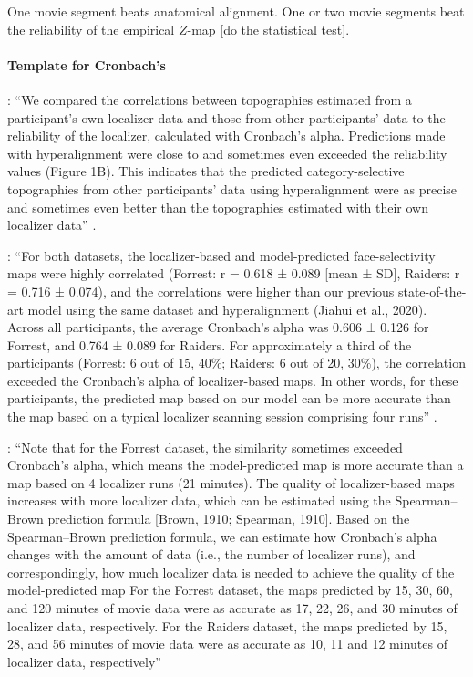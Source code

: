 One movie segment beats anatomical alignment.
%
One or two movie segments beat the reliability of the empirical $Z$-map [do the
statistical test].


\paragraph{Template for Cronbach's}

%
\citep{jiahui2022cross}: ``We compared the correlations between topographies
estimated from a participant's own localizer data and those from other
participants' data to the reliability of the localizer, calculated with
Cronbach's alpha.
%
Predictions made with hyperalignment were close to and sometimes even exceeded
the reliability values (Figure 1B).
%
This indicates that the predicted category-selective topographies from other
participants' data using hyperalignment were as precise and sometimes even
better than the topographies estimated with their own localizer data''
\citep{jiahui2022cross}.

%
\citep{feilong2022individualized}: ``For both datasets, the localizer-based and
model-predicted face-selectivity maps were highly correlated (Forrest: r = 0.618
± 0.089 [mean ± SD], Raiders: r = 0.716 ± 0.074), and the correlations were
higher than our previous state-of-the-art model using the same dataset and
hyperalignment (Jiahui et al., 2020).
%
Across all participants, the average Cronbach's alpha was 0.606 ± 0.126 for
Forrest, and 0.764 ± 0.089 for Raiders.
%
For approximately a third of the participants (Forrest: 6 out of 15, 40\%;
Raiders: 6 out of 20, 30\%), the correlation exceeded the Cronbach's alpha of
localizer-based maps.
%
In other words, for these participants, the predicted map based on our model can
be more accurate than the map based on a typical localizer scanning session
comprising four runs'' \citep{feilong2022individualized}.

%
\citep{feilong2022individualized}: ``Note that for the Forrest dataset, the
similarity sometimes exceeded Cronbach's alpha, which means the model-predicted
map is more accurate than a map based on 4 localizer runs (21 minutes).
%
The quality of localizer-based maps increases with more localizer data, which
can be estimated using the Spearman–Brown prediction formula [Brown, 1910;
Spearman, 1910].
%
Based on the Spearman–Brown prediction formula, we can estimate how Cronbach's
alpha changes with the amount of data (i.e., the number of localizer runs), and
correspondingly, how much localizer data is needed to achieve the quality of the
model-predicted map
%
For the Forrest dataset, the maps predicted by 15, 30, 60, and 120 minutes of
movie data were as accurate as 17, 22, 26, and 30 minutes of localizer data,
respectively.
%
For the Raiders dataset, the maps predicted by 15, 28, and 56 minutes of movie
data were as accurate as 10, 11 and 12 minutes of localizer data, respectively''
\citep{feilong2022individualized}

